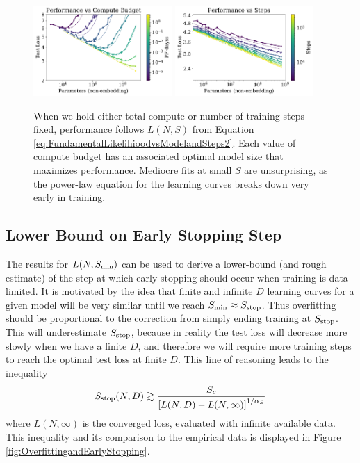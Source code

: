 \documentclass[english]{article}
\newcommand{\be}{\begin{equation}}
\newcommand{\ee}{\end{equation}}
\begin{document}
\begin{figure}
\noindent \centering{}
\includegraphics[width=0.47\textwidth]{PerfVsParams-ComputeBudget}\hfill
\includegraphics[width=0.47\textwidth]{PerfVsParams-StepBudget} 
\caption[Performance versus compute budget or number of parameter updates]{
When we hold either total compute or number of training steps fixed, performance follows $L(N,S)$ from Equation \eqref{eq:FundamentalLikelihioodvsModelandSteps2}.  Each value of compute budget has an associated optimal model size that maximizes performance.  Mediocre fits at small $S$ are unsurprising, as the power-law equation for the learning curves breaks down very early in training. \label{fig:ComputevsParamsvsPerformance}}
\end{figure}

\subsection{Lower Bound on Early Stopping Step}
\label{sec:EarlyStop}

The results for $L(N,S_{\rm min})$ can be used to derive a lower-bound (and rough estimate) of the step at which early stopping should occur when training is data limited.  
It is motivated by the idea that finite and infinite $D$ learning curves for a given model will be very similar until we reach $S_{\rm min} \approx S_{\rm stop}$. Thus overfitting should be proportional to the correction from simply ending  training at $S_{\rm stop}$.  This will underestimate $S_{\rm stop}$, because in reality the test loss will decrease more slowly when we have a finite $D$, and therefore we will require more training steps to reach the optimal test loss at finite $D$.  
This line of reasoning leads to the inequality
\be
\label{eq:EarlyStopInequality}
S_{\rm stop}(N,D)  \gtrsim \frac{S_c}{\left[ L(N,D) - L(N, \infty) \right]^{1 / \alpha_S}}
\ee
where $L(N, \infty)$ is the converged loss, evaluated with infinite available data.  This inequality and its comparison to the empirical data is displayed in Figure \ref{fig:OverfittingandEarlyStopping}.
\end{document}
